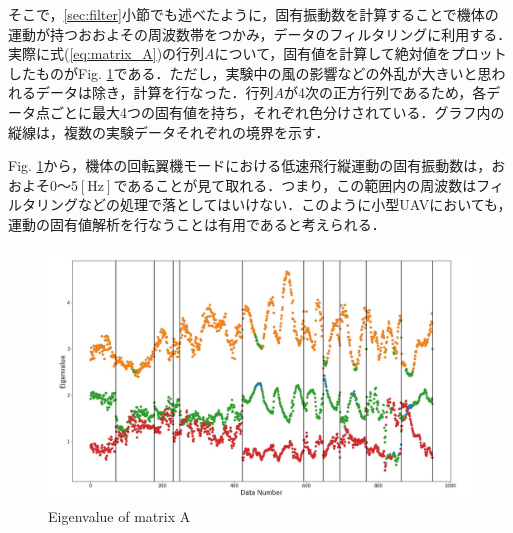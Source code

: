 

そこで，\ref{sec:filter}小節でも述べたように，固有振動数を計算することで機体の運動が持つおおよその周波数帯をつかみ，データのフィルタリングに利用する．実際に式(\ref{eq:matrix_A})の行列$A$について，固有値を計算して絶対値をプロットしたものがFig. \ref{fig:eigenvalue}である．ただし，実験中の風の影響などの外乱が大きいと思われるデータは除き，計算を行なった．行列$A$が4次の正方行列であるため，各データ点ごとに最大4つの固有値を持ち，それぞれ色分けされている．グラフ内の縦線は，複数の実験データそれぞれの境界を示す．

Fig. \ref{fig:eigenvalue}から，機体の回転翼機モードにおける低速飛行縦運動の固有振動数は，おおよそ0〜5$\mathrm{[Hz]}$であることが見て取れる．つまり，この範囲内の周波数はフィルタリングなどの処理で落としてはいけない．このように小型UAVにおいても，運動の固有値解析を行なうことは有用であると考えられる．

\begin{figure}[H]
	\centering
	\includegraphics[clip,width=15.0cm,bb=0 0 1250 750]{./z_figure_files/chapter5/1_eigenvalue.jpeg}
	\caption{Eigenvalue of matrix A}
	\label{fig:eigenvalue}
\end{figure}

